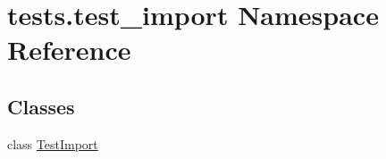 \hypertarget{namespacetests_1_1test__import}{}\section{tests.\+test\+\_\+import Namespace Reference}
\label{namespacetests_1_1test__import}
\subsection*{Classes}
\begin{DoxyCompactItemize}
\item 
class \hyperlink{classtests_1_1test__import_1_1TestImport}{Test\+Import}
\end{DoxyCompactItemize}

